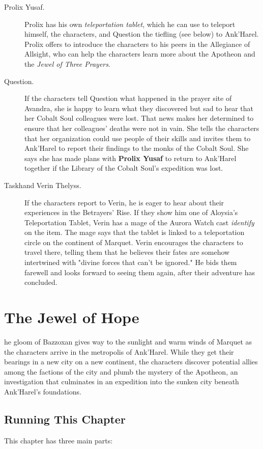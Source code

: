 \documentclass[10pt,a4paper,twoside,fancy,bg=print,twocolumn,openany,nodeprecatedcode]{dndbook}
\begin{document}
\begin{description}
\item[Prolix Yusaf.]
Prolix has his own \textit{teleportation tablet}, which he can use to teleport himself, the characters, and Question the tiefling (see below) to Ank'Harel. Prolix offers to introduce the characters to his peers in the Allegiance of Allsight, who can help the characters learn more about the Apotheon and the \textit{Jewel of Three Prayers}.
\item[Question.]
If the characters tell Question what happened in the prayer site of Avandra, she is happy to learn what they discovered but sad to hear that her Cobalt Soul colleagues were lost. That news makes her determined to ensure that her colleagues' deaths were not in vain. She tells the characters that her organization could use people of their skills and invites them to Ank'Harel to report their findings to the monks of the Cobalt Soul. She says she has made plans with \textbf{Prolix Yusaf} to return to Ank'Harel together if the Library of the Cobalt Soul's expedition was lost.
\item[Taskhand Verin Thelyss.]
If the characters report to Verin, he is eager to hear about their experiences in the Betrayers' Rise. If they show him one of Aloysia's Teleportation Tablet, Verin has a mage of the Aurora Watch cast \textit{identify} on the item. The mage says that the tablet is linked to a teleportation circle on the continent of Marquet. Verin encourages the characters to travel there, telling them that he believes their fates are somehow intertwined with "divine forces that can't be ignored." He bids them farewell and looks forward to seeing them again, after their adventure has concluded.
\end{description}

\chapter{The Jewel of Hope}
he gloom of Bazzoxan gives way to the sunlight and warm winds of Marquet as the characters arrive in the metropolis of Ank'Harel. While they get their bearings in a new city on a new continent, the characters discover potential allies among the factions of the city and plumb the mystery of the Apotheon, an investigation that culminates in an expedition into the sunken city beneath Ank'Harel's foundations.


\section{Running This Chapter}
This chapter has three main parts:
\end{document}
